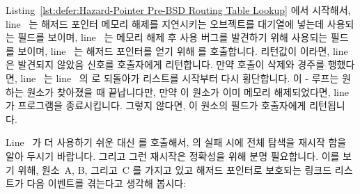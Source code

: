 \begin{lineref}
Listing~\ref{lst:defer:Hazard-Pointer Pre-BSD Routing Table Lookup}
에서 시작해서, line~ 는 해저드 포인터 메모리 해제를 지연시키는
오브젝트를 대기열에 넣는데 사용되는  필드를 보이며,
line~ 는 메모리 해제 후 사용 버그를 발견하기 위해 사용되는
 필드를 보이며, line~ 는 해저드 포인터를 얻기
위해  를 호출합니다.
리턴값이  이라면, line~ 은 발견되지 않았음 신호를
호출자에게 리턴합니다.
만약  호출이 삭제와 경주를 행했다면, line~
는 line~ 의  로 되돌아가 리스트를 시작부터 다시
횡단합니다.
이 - 루프는 원하는 원소가 찾아졌을 때 끝납니다만, 만약 이
원소가 이미 메모리 해제되었다면, line~ 가 프로그램을 종료시킵니다.
그렇지 않다면, 이 원소의  필드가 호출자에게 리턴됩니다.

Line~ 가 더 사용하기 쉬운  대신
 를 호출해서,  의 실패 시에
전체 탐색을 재시작 함을 알아 두시기 바랍니다.
그리고 그런 재시작은 정확성을 위해 분명 필요합니다.  이를 보기 위해, 원소~A, B,
그리고~C 를 가지고 있고 해저드 포인터로 보호되는 링크드 리스트가 다음 이벤트를
겪는다고 생각해 봅시다:

\end{lineref}

